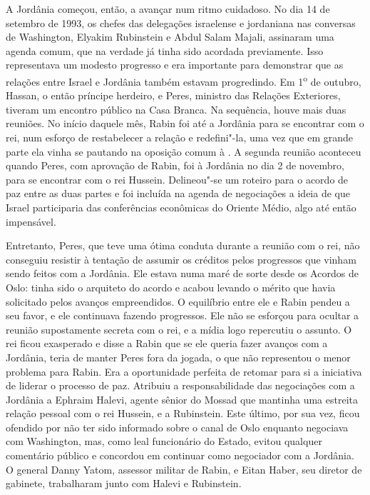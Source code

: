 A Jordânia começou, então, a avançar num ritmo cuidadoso. No dia 14 de
setembro de 1993, os chefes das delegações israelense e jordaniana nas
conversas de Washington, Elyakim Rubinstein e Abdul Salam Majali,
assinaram uma agenda comum, que na verdade já tinha sido acordada
previamente. Isso representava um modesto progresso e era
importante para demonstrar que as relações entre Israel e Jordânia
também estavam progredindo. Em 1\textsuperscript{o} de outubro, Hassan, o então príncipe
herdeiro, e Peres, ministro das Relações Exteriores, tiveram um encontro
público na Casa Branca. Na sequência, houve mais duas reuniões. No
início daquele mês, Rabin foi até a Jordânia para se encontrar com o rei,
num esforço de restabelecer a relação e redefini"-la, uma vez que em
grande parte ela vinha se pautando na oposição comum à . A segunda
reunião aconteceu quando Peres, com aprovação de Rabin, foi à Jordânia
no dia 2 de novembro, para se encontrar com o rei Hussein. Delineou"-se
um roteiro para o acordo de paz entre as duas partes e foi incluída na
agenda de negociações a ideia de que Israel participaria das
conferências econômicas do Oriente Médio, algo até então impensável.

Entretanto, Peres, que teve uma ótima conduta durante a reunião com o rei,
não conseguiu resistir à tentação de assumir os créditos pelos
progressos que vinham sendo feitos com a Jordânia. Ele estava numa maré
de sorte desde os Acordos de Oslo: tinha sido o arquiteto do acordo e
acabou levando o mérito que havia solicitado pelos avanços empreendidos.
O equilíbrio entre ele e Rabin pendeu a seu favor, e ele continuava
fazendo progressos. Ele não se esforçou para ocultar a reunião
supostamente secreta com o rei, e a mídia logo repercutiu o assunto. O
rei ficou exasperado e disse a Rabin que se ele queria fazer avanços com
a Jordânia, teria de manter Peres fora da jogada, o que não representou o menor
problema para Rabin. Era a oportunidade perfeita de retomar para si a
iniciativa de liderar o processo de paz. Atribuiu a responsabilidade das
negociações com a Jordânia a Ephraim Halevi, agente sênior do Mossad que
mantinha uma estreita relação pessoal com o rei Hussein, e a Rubinstein.
Este último, por sua vez, ficou ofendido por não ter sido informado sobre o canal de
Oslo enquanto negociava com Washington, mas, como leal funcionário do
Estado, evitou qualquer comentário público e concordou em continuar como
negociador com a Jordânia. O general Danny Yatom, assessor militar de
Rabin, e Eitan Haber, seu diretor de gabinete, trabalharam junto com
Halevi e Rubinstein.

